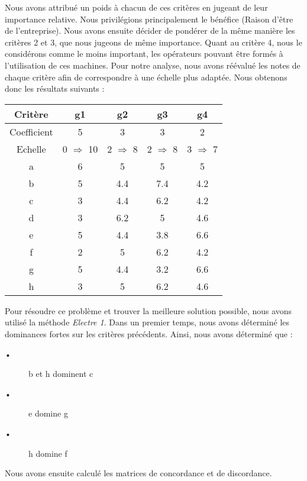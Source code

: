 \documentclass[12pt]{article}
\begin{document}
Nous avons attribué un poids à chacun de ces critères en jugeant de leur importance relative. Nous privilégions principalement le bénéfice (Raison d'être de l'entreprise). Nous avons ensuite décider de pondérer de la même manière les critères 2 et 3, que nous jugeons de même importance. Quant au critère 4, nous le considérons comme le moins important, les opérateurs pouvant être formés à l'utilisation de ces machines.
Pour notre analyse, nous avons réévalué les notes de chaque critère afin de correspondre à une échelle plus adaptée. Nous obtenons donc les résultats suivants :\newline
\begin{center}
\begin{tabular}{|c|c|c|c|c|}
\hline 
Critère & g1 & g2 & g3 & g4 \\ 
\hline 
Coefficient & 5 & 3 & 3 & 2 \\ 
\hline 
Echelle & 0 $ \Rightarrow $ 10 & 2 $ \Rightarrow $ 8 & 2 $ \Rightarrow $ 8 & 3 $ \Rightarrow $ 7 \\ 
\hline 
a & 6 & 5 & 5 & 5 \\ 
\hline 
b & 5 & 4.4 & 7.4 & 4.2 \\ 
\hline 
c & 3 & 4.4 & 6.2 & 4.2 \\ 
\hline 
d & 3 & 6.2 & 5 & 4.6 \\ 
\hline 
e & 5 & 4.4 & 3.8 & 6.6 \\ 
\hline 
f & 2 & 5 & 6.2 & 4.2 \\ 
\hline 
g & 5 & 4.4 & 3.2 & 6.6 \\ 
\hline 
h & 3 & 5 & 6.2 & 4.6 \\ 
\hline 
\end{tabular} 
\end{center}
Pour résoudre ce problème et trouver la meilleure solution possible, nous avons utilisé la méthode \emph{Electre 1}.
Dans un premier temps, nous avons déterminé les dominances fortes sur les critères précédents. Ainsi, nous avons déterminé que :
\begin{description}
\item[•]b et h dominent c
\item[•] e domine g
\item[•] h domine f
\end{description}
Nous avons ensuite calculé les matrices de concordance et de discordance.
\end{document}
